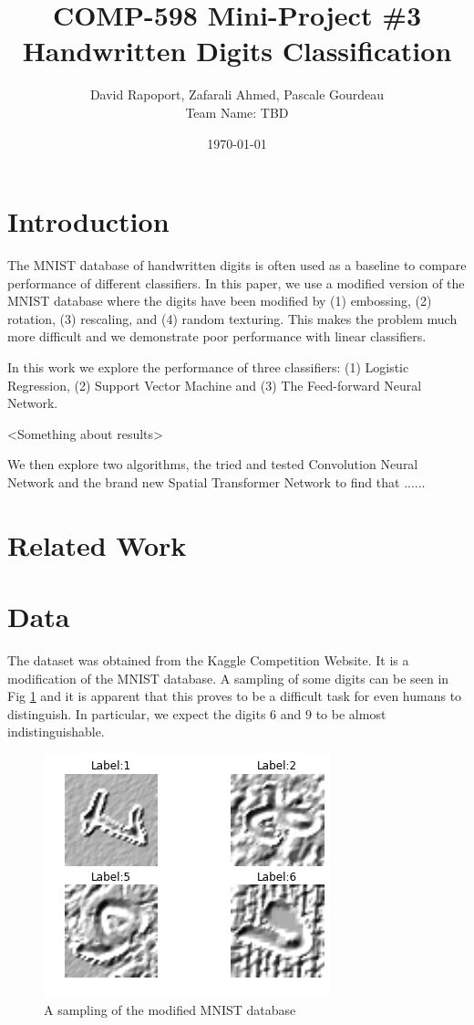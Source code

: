 \documentclass[conference]{IEEEtran}
\author{David Rapoport, Zafarali Ahmed, Pascale Gourdeau\\Team Name: TBD}
\title{COMP-598 Mini-Project \#3\\Handwritten Digits Classification}
\date{\today}
\begin{document}
\maketitle

\section{Introduction}
The MNIST database\cite{MnistHome} of handwritten digits is often used as a baseline to compare performance of different classifiers. In this paper, we use a modified version of the MNIST database where the digits have been modified by (1) embossing, (2) rotation, (3) rescaling, and (4) random texturing. This makes the problem much more difficult and we demonstrate poor performance with linear classifiers.

In this work we explore the performance of three classifiers: (1) Logistic Regression, (2) Support Vector Machine and (3) The Feed-forward Neural Network. 

<Something about results>

We then explore two algorithms, the tried and tested Convolution Neural Network \cite{LeCunn98}\cite{CNN_committees} and the brand new Spatial Transformer Network \cite{STN} to find that ......


\section{Related Work}




\section{Data}
The dataset was obtained from the Kaggle Competition Website. It is a modification of the MNIST \cite{MnistHome} database. A sampling of some digits can be seen in Fig \ref{MNISTSample} and it is apparent that this proves to be a difficult task for even humans to distinguish. In particular, we expect the digits $6$ and $9$ to be almost indistinguishable.

\begin{figure}[h]
	\centering
	\includegraphics[scale=0.40]{sample_of_images.png}
	\caption{A sampling of the modified MNIST database}
	\label{MNISTSample}
\end{figure}
\end{document}
